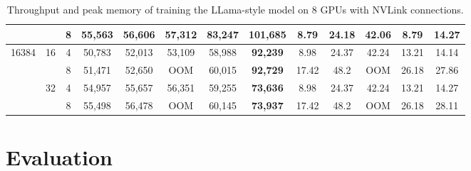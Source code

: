\documentclass[sigplan,review,anonymous]{acmart}
\begin{document}
\begin{table}[!ht]
\begin{tabular}{ccc|ccccc|ccccc}
                       &                     & 8 & 55,563  & 56,606 & 57,312 & 83,247 & \textbf{101,685} & 8.79  & 24.18 & 42.06 & 8.79  & 14.27   \\ \hline
\multirow{4}{*}{16384} & \multirow{2}{*}{16} & 4 & 50,783  & 52,013 & 53,109 & 58,988 & \textbf{92,239}  & 8.98  & 24.37 & 42.24 & 13.21 & 14.14   \\
                       &                     & 8 & 51,471  & 52,650 & OOM    & 60,015 & \textbf{92,729}  & 17.42 & 48.2  & OOM   & 26.18 & 27.86   \\
                       & \multirow{2}{*}{32} & 4 & 54,957  & 55,657 & 56,351 & 59,255 & \textbf{73,636}  & 8.98  & 24.37 & 42.24 & 13.21 & 14.27   \\
                       &                     & 8 & 55,498  & 56,478 & OOM    & 60,145 & \textbf{73,937}  & 17.42 & 48.2  & OOM   & 26.18 & 28.11   \\ \hline
\end{tabular}
\caption{Throughput and peak memory of training the LLama-style model on 8 GPUs with NVLink connections.}
\label{tab:perform_nvlink}
\end{table}

\section{Evaluation}

\end{document}
